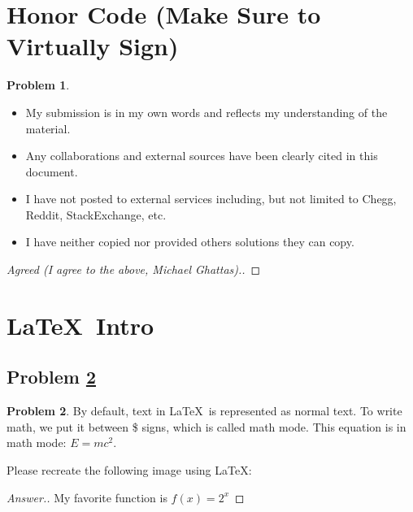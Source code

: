 \documentclass[11pt]{article}
\theoremstyle{definition}
\theoremstyle{definition}
\newtheorem{required}{Problem}
\theoremstyle{definition}
\begin{document}
\section{Honor Code (Make Sure to Virtually Sign)} \label{HonorCode}

\begin{required}
\begin{itemize}
\item My submission is in my own words and reflects my understanding of the material.
\item Any collaborations and external sources have been clearly cited in this document.
\item I have not posted to external services including, but not limited to Chegg, Reddit, StackExchange, etc.
\item I have neither copied nor provided others solutions they can copy.
\end{itemize}

\end{required}

\begin{proof}[Agreed (I agree to the above, Michael Ghattas).]
\end{proof}


\newpage
\section{\LaTeX\ Intro}

\subsection{Problem \ref{Latex1}}
\begin{required} \label{Latex1}
By default, text in \LaTeX\ is represented as normal text. To write math, we put it between \$ signs, which is called math mode.
This equation is in math mode: $E=mc^2$.

Please recreate the following image using \LaTeX:

\end{required}

\begin{proof}[Answer.]
My favorite function is $f(x)=2^x$
\end{proof}
\end{document}
